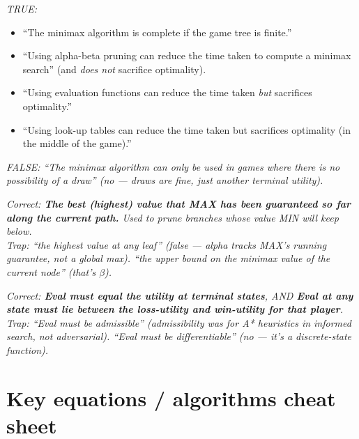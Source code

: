 \documentclass[11pt, a4paper]{article}
\begin{document}
\begin{exambox}
\textit{TRUE:}
\begin{itemize}[leftmargin=*, itemsep=0pt, topsep=0pt]
  \item ``The minimax algorithm is complete if the game tree is finite.''
  \item ``Using alpha-beta pruning can reduce the time taken to compute a minimax search'' (and \emph{does not} sacrifice optimality).
  \item ``Using evaluation functions can reduce the time taken \emph{but} sacrifices optimality.''
  \item ``Using look-up tables can reduce the time taken but sacrifices optimality (in the middle of the game).''
\end{itemize}
\textit{FALSE: ``The minimax algorithm can only be used in games where there is no possibility of a draw'' (no — draws are fine, just another terminal utility).}
\end{exambox}

\begin{exambox}
\textit{Correct: \textbf{The best (highest) value that MAX has been guaranteed so far along the current path.} Used to prune branches whose value MIN will keep below.}\\[0.3em]
\textit{Trap: ``the highest value at any leaf'' (false — alpha tracks MAX's running guarantee, not a global max). ``the upper bound on the minimax value of the current node'' (that's $\beta$).}
\end{exambox}

\begin{exambox}
\textit{Correct: \textbf{Eval must equal the utility at terminal states}, AND \textbf{Eval at any state must lie between the loss-utility and win-utility for that player}.}\\[0.3em]
\textit{Trap: ``Eval must be admissible'' (admissibility was for A* heuristics in informed search, not adversarial). ``Eval must be differentiable'' (no — it's a discrete-state function).}
\end{exambox}

\section*{Key equations / algorithms cheat sheet}
\end{document}
